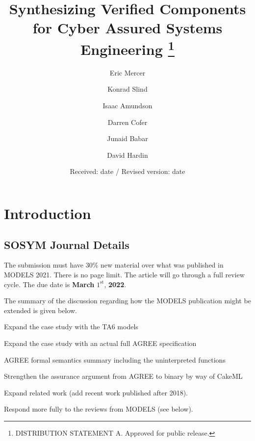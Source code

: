 \documentclass[global,twocolumn]{svjour}
\begin{document}
\title{
  Synthesizing Verified Components for Cyber Assured Systems Engineering
  \thanks{DISTRIBUTION STATEMENT A.  Approved for public release.}
}

\author{
  Eric Mercer    \and 
  Konrad Slind   \and
  Isaac Amundson \and
  Darren Cofer   \and
  Junaid Babar   \and
  David Hardin
}


\date{Received: date / Revised version: date}

\maketitle

\begin{abstract}

\end{abstract}

\section{Introduction} \label{sec:intro}

\subsection{SOSYM Journal Details}
The submission must have 30\% new material over what was published in MODELS 2021.
There is no page limit.
The article will go through a full review cycle.
The due date is \textbf{March} $1^\mathrm{st}$, \textbf{2022}.

\noindent The summary of the discussion regarding how the MODELS publication might be extended is given below.
\begin{compactitem}
  \item Expand the case study with the TA6 models
  \item Expand the case study with an actual full AGREE specification
  \item AGREE formal semantics summary including the uninterpreted functions
  \item Strengthen the assurance argument from AGREE to binary by way of CakeML
  \item Expand related work (add recent work published after 2018). 
  \item Respond more fully to the reviews from MODELS (see below).
\end{compactitem}
\end{document}
